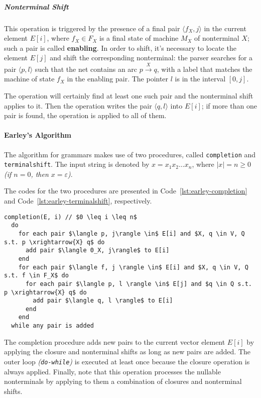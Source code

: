 \documentclass[english]{article}
\begin{document}
\subparagraph*{Nonterminal Shift}
This operation is triggered by the presence of a final pair \(\langle f_X, j \rangle\) in the current element \(E[i]\), where \(f_X \in F_X\) is a final state of machine \(M_X\) of nonterminal \(X\);
such a pair is called \textbf{enabling}.
In order to shift, it's necessary to locate the element \(E[j]\) and shift the corresponding nonterminal:
the parser searches for a pair \(\langle p, l \rangle\) such that the net contains an arc \(p \xrightarrow{X} q\), with a label that matches the machine of state \(f_X\) in the enabling pair.
The pointer \(l\) is in the interval \(\left[ 0, j \right]\).

The operation will certainly find at least one such pair and the nonterminal shift applies to it.
Then the operation writes the pair \(\langle q, l\rangle\) into \(E[i]\); if more than one pair is found, the operation is applied to all of them.

\paragraph{Earley's Algorithm}

The algorithm for \EBNF grammars makes use of two procedures, called \texttt{completion} and \texttt{terminalshift}.
The input string is denoted by \(x = x_1 x_2 \ldots x_n\), where \(|x| = n \geq 0\) \textit{(if \(n = 0\), then \(x = \varepsilon\))}.

The codes for the two procedures are presented in Code~\ref{lst:earley-completion} and Code~\ref{lst:earley-terminalshift}, respectively.

\begin{lstlisting}[caption={\texttt{completion} procedure}, label={lst:earley-completion}]
completion(E, i) // $0 \leq i \leq n$
  do
    for each pair $\langle p, j\rangle \in$ E[i] and $X, q \in V, Q s.t. p \xrightarrow{X} q$ do
      add pair $\langle 0_X, j\rangle$ to E[i]
    end
    for each pair $\langle f, j \rangle \in$ E[i] and $X, q \in V, Q s.t. f \in F_X$ do
      for each pair $\langle p, l \rangle \in$ E[j] and $q \in Q s.t. p \xrightarrow{X} q$ do
        add pair $\langle q, l \rangle$ to E[i]
      end
    end
  while any pair is added
\end{lstlisting}

The completion procedure adds new pairs to the current vector element \(E[i]\) by applying the closure and nonterminal shifts as long as new pairs are added.
The outer loop \textit{(\texttt{do-while})} is executed at least once because the closure operation is always applied.
Finally, note that this operation processes the nullable nonterminals by applying to them a combination of closures and nonterminal shifts.
\end{document}
